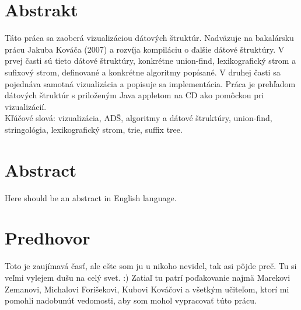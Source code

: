 \chapter*{Abstrakt}
Táto práca sa zaoberá vizualizáciou dátových štruktúr. Nadväzuje na bakalársku prácu Jakuba Kováča (2007) a rozvíja kompiláciu 
o ďalšie dátové štruktúry. V prvej časti sú tieto dátové štruktúry, konkrétne union-find, lexikografický strom a sufixový strom,
definované a konkrétne algoritmy popísané. V druhej časti sa pojednáva samotná vizualizácia a popisuje 
sa implementácia. Práca je prehľadom dátových štruktúr s priloženým Java appletom na CD ako pomôckou pri vizualizácií.\\
Kľúčové slová: vizualizácia, ADŠ, algoritmy a dátové štruktúry, union-find, stringológia, lexikografický strom, trie, suffix tree.

\newpage

\chapter*{Abstract}
Here should be an abstract in English language.
\newpage

\chapter*{Predhovor}
Toto je zaujímavá časť, ale ešte som ju u nikoho nevidel, tak asi pôjde preč.
Tu si veľmi vylejem dušu na celý svet. :) Zatiaľ tu patrí poďakovanie najmä Marekovi Zemanovi, Michalovi
Forišekovi, Kubovi Kováčovi a všetkým učiteľom, ktorí mi pomohli nadobunúť vedomosti, aby som mohol vypracovať
túto prácu.
\newpage

\mbox{}
\newpage

\tableofcontents\newpage
